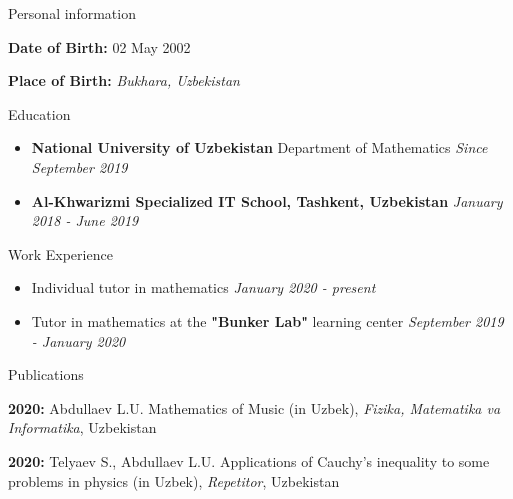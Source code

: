 \documentclass{resume} %
\begin{document}
\begin{rSection}{Personal information}
\item \textbf{Date of Birth:} 02 May 2002
\item \textbf{Place of Birth:} \textit{Bukhara, Uzbekistan}
\end{rSection}
\begin{rSection}{Education}
	\begin{itemize}
		\item {\bf National University of Uzbekistan} Department of Mathematics \hfill {\em Since  September 2019} 
		 
		\item {\bf Al-Khwarizmi Specialized IT School, Tashkent, Uzbekistan} \hfill {\em January 2018 - June 2019}
		
	\end{itemize}

\end{rSection}




\begin{rSection}{Work Experience}
\begin{itemize}
	\item Individual tutor in mathematics \hfill{\emph{January 2020 - present}}
	\item Tutor in mathematics at the \textbf{"Bunker Lab"} learning center \hfill{\emph{September 2019 - January 2020}}
	
	
	
\end{itemize}
\end{rSection}

\begin{rSection}{Publications}
	\begin{itemize}
		\textbf{2020:} Abdullaev L.U. Mathematics of Music (in Uzbek), \emph{Fizika, Matematika va Informatika}, Uzbekistan 
		
		\textbf{2020:} Telyaev S., Abdullaev L.U.  Applications of Cauchy's inequality to some problems in physics (in Uzbek), \emph{Repetitor}, Uzbekistan
		
		
		
	\end{itemize}
\end{rSection}
\end{document}
